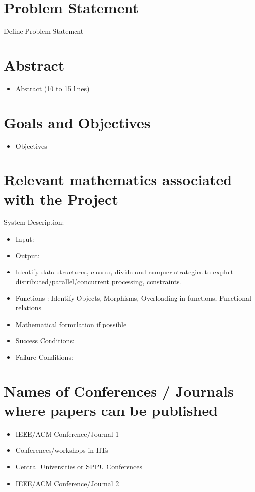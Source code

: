 \documentclass[oneside,a4paper,12pt]{report}
\begin{document}
\section{Problem Statement}
\label{sec:problem}
        Define Problem Statement
\section{Abstract}
\begin{itemize}
	\item Abstract (10 to 15 lines)
\end{itemize}

\section{Goals and Objectives}
\begin{itemize}
	\item Objectives
\end{itemize}

	
\section{Relevant mathematics associated with the Project}
\label{sec:math}
System Description:
\begin{itemize} 
\item Input:	 
\item Output:	 
\item Identify data structures, classes, divide and conquer strategies to exploit distributed/parallel/concurrent processing, constraints. 
\item Functions : Identify Objects, Morphisms, Overloading in functions, Functional relations
\item Mathematical formulation if possible
\item Success Conditions:	 
\item Failure Conditions:		
\end{itemize}


\section{Names of Conferences / Journals where papers can be published}
\begin{itemize}
\item  IEEE/ACM Conference/Journal 1 
\item  Conferences/workshops in IITs
\item  Central Universities or SPPU Conferences 
\item IEEE/ACM Conference/Journal 2 
\end{itemize}
\end{document}
